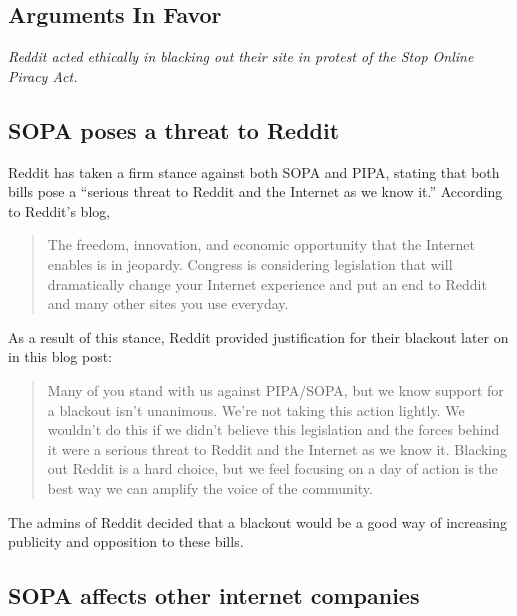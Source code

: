 \documentclass[11pt]{article}
\begin{document}
\begin{multicols}{2}

   \section{Arguments In Favor}

\emph{Reddit acted ethically in blacking out their site in protest of the Stop Online Piracy Act.}

   \subsection{SOPA poses a threat to Reddit}

Reddit has taken a firm stance against both SOPA and PIPA, stating that both bills pose a ``serious threat to Reddit and the Internet as we know it.''\cite{reddit-blackout-blog} According to Reddit's blog, 

\begin{quote}The freedom, innovation, and economic opportunity that the Internet enables is in jeopardy. Congress is considering legislation that will dramatically change your Internet experience and put an end to Reddit and many other sites you use everyday.\cite{reddit-blackout-blog}\end{quote}

As a result of this stance, Reddit provided justification for their blackout later on in this blog post:

\begin{quote}Many of you stand with us against PIPA/SOPA, but we know support for a blackout isn’t unanimous. We're not taking this action lightly. We wouldn’t do this if we didn’t believe this legislation and the forces behind it were a serious threat to Reddit and the Internet as we know it. Blacking out Reddit is a hard choice, but we feel focusing on a day of action is the best way we can amplify the voice of the community.\cite{reddit-blackout-blog}\end{quote}

The admins of Reddit decided that a blackout would be a good way of increasing publicity and opposition to these bills.

   \subsection{SOPA affects other internet companies}


\end{multicols}
\end{document}
